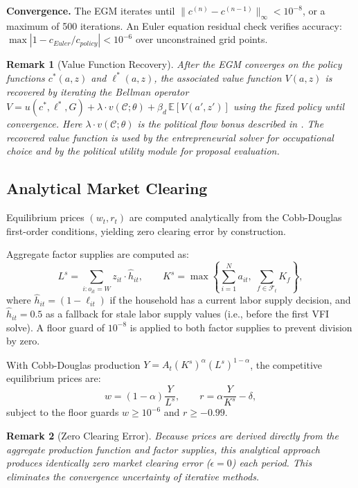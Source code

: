 \documentclass[12pt]{article}
\newtheorem{remark}{Remark}
\newcommand{\E}{\mathbb{E}}
\newcommand{\calC}{\mathcal{C}}
\newcommand{\calF}{\mathcal{F}}
\begin{document}
\textbf{Convergence.} The EGM iterates until $\|c^{(n)} - c^{(n-1)}\|_\infty < 10^{-8}$, or a maximum of 500 iterations. An Euler equation residual check verifies accuracy: $\max |1 - c_{Euler}/c_{policy}| < 10^{-6}$ over unconstrained grid points.

\begin{remark}[Value Function Recovery]
After the EGM converges on the policy functions $c^*(a, z)$ and $\ell^*(a, z)$, the associated value function $V(a, z)$ is recovered by iterating the Bellman operator $V = u(c^*, \ell^*, G) + \lambda \cdot v(\calC; \theta) + \beta_d \, \E[V(a', z')]$ using the fixed policy until convergence. Here $\lambda \cdot v(\calC; \theta)$ is the political flow bonus described in . The recovered value function is used by the entrepreneurial solver for occupational choice and by the political utility module for proposal evaluation.
\end{remark}


\subsection{Analytical Market Clearing}\label{sec:market_clearing}

Equilibrium prices $(w_t, r_t)$ are computed analytically from the Cobb-Douglas first-order conditions, yielding zero clearing error by construction.

Aggregate factor supplies are computed as:
\begin{equation}\label{eq:factor_supplies}
  L^s = \sum_{i: o_{it} = W} z_{it} \cdot \hat{h}_{it}, \qquad K^s = \max\!\left\{\sum_{i=1}^{N} a_{it},\; \sum_{f \in \calF_t} K_f\right\},
\end{equation}
where $\hat{h}_{it} = (1 - \ell_{it})$ if the household has a current labor supply decision, and $\hat{h}_{it} = 0.5$ as a fallback for stale labor supply values (i.e., before the first VFI solve). A floor guard of $10^{-8}$ is applied to both factor supplies to prevent division by zero.

With Cobb-Douglas production $Y = A_t (K^s)^\alpha (L^s)^{1-\alpha}$, the competitive equilibrium prices are:
\begin{equation}\label{eq:analytical_prices}
  w = (1-\alpha) \frac{Y}{L^s}, \qquad r = \alpha \frac{Y}{K^s} - \delta,
\end{equation}
subject to the floor guards $w \geq 10^{-6}$ and $r \geq -0.99$.

\begin{remark}[Zero Clearing Error]
Because prices are derived directly from the aggregate production function and factor supplies, this analytical approach produces identically zero market clearing error ($\epsilon = 0$) each period. This eliminates the convergence uncertainty of iterative methods.
\end{remark}
\end{document}
